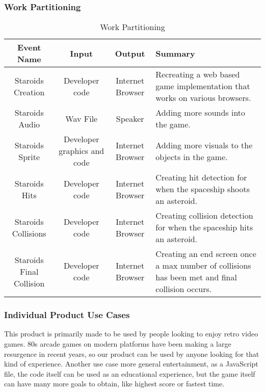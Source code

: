 \documentclass[12pt, titlepage]{article}
\begin{document}
\subsubsection{Work Partitioning}
	\begin{table}[H]
	\caption{Work Partitioning}
		\begin{adjustwidth}{-2.75cm}{}
    	\begin{tabular}{|c|c|c|p{5cm}|}
    	\hline
    	Event Name & Input & Output & Summary\\
    	\hline
    	Staroids Creation & Developer code & Internet Browser & Recreating a web based game implementation that works on various browsers.\\
    	\hline
    	Staroids Audio & Wav File & Speaker & Adding more sounds into the game.\\
    	\hline
    	Staroids Sprite & Developer graphics and code & Internet Browser & Adding more visuals to the objects in the game.\\
    	\hline
    	Staroids Hits & Developer code & Internet Browser & Creating hit detection for when the spaceship shoots an asteroid. \\
    	\hline
    	Staroids Collisions & Developer code & Internet Browser & Creating collision detection for when the spaceship hits an asteroid.\\
    	\hline
    	Staroids Final Collision & Developer code & Internet Browser & Creating an end screen once a max number of collisions has been met and final collision occurs.\\
    	\hline
      \end{tabular}
		\end{adjustwidth}
	\end{table}

\subsubsection{Individual Product Use Cases}
This product is primarily made to be used by people looking to enjoy retro video games. 80s arcade games on modern platforms have been making a large resurgence in recent years, so our product can be used by anyone looking for that kind of experience. Another use case more general entertainment, as a JavaScript file, the code itself can be used as an educational experience, but the game itself can have many more goals to obtain, like highest score or fastest time.\\
\end{document}
